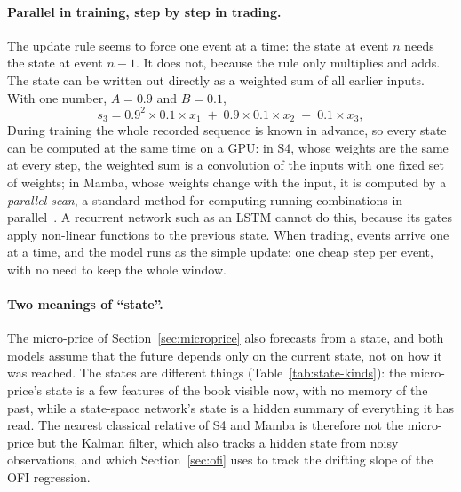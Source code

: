 \paragraph{Parallel in training, step by step in trading.} The update rule seems to force one event at a time: the
state at event $n$ needs the state at event $n-1$. It does not, because the rule only multiplies and adds. The state
can be written out directly as a weighted sum of all earlier inputs. With one number, $A = 0.9$ and $B = 0.1$,
\[
  s_3 = 0.9^2 \times 0.1 \times x_1 \;+\; 0.9 \times 0.1 \times x_2 \;+\; 0.1 \times x_3 ,
\]
During training the whole recorded sequence is known in advance, so every state can be computed at the same time on a
GPU: in S4, whose weights are the same at every step, the weighted sum is a convolution of the inputs with one fixed
set of weights; in Mamba, whose weights change with the input, it is computed by a \emph{parallel scan}, a standard
method for computing running combinations in parallel~\citep{gu2024mamba}. A recurrent network such as an LSTM cannot
do this, because its gates apply non-linear functions to the previous state. When trading, events arrive one at a
time, and the model runs as the simple update: one cheap step per event, with no need to keep the whole window.

\paragraph{Two meanings of ``state''.} The micro-price of Section~\ref{sec:microprice} also forecasts from a state,
and both models assume that the future depends only on the current state, not on how it was reached. The states are
different things (Table~\ref{tab:state-kinds}): the micro-price's state is a few features of the book visible now,
with no memory of the past, while a state-space network's state is a hidden summary of everything it has read. The
nearest classical relative of S4 and Mamba is therefore not the micro-price but the Kalman filter, which also tracks a
hidden state from noisy observations, and which Section~\ref{sec:ofi} uses to track the drifting slope of the OFI
regression.

